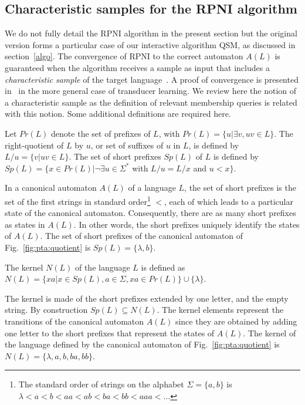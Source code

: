 \subsection{Characteristic samples for the RPNI algorithm\label{subsection:gi-background-rpni}}

We do not fully detail the RPNI algorithm in the present section but the original version forms a particular case
of our interactive algorithm \textsc{QSM}, as discussed in section~\ref{algo}. The convergence of RPNI to the correct automaton $A(L)$ is guaranteed when the algorithm receives a sample as input that includes a \textsl{characteristic sample} of the target language~\cite{Oncina:1992}. A proof of convergence is presented in~\cite{Oncina:1993} in the more general case of transducer learning. We review here the notion of a characteristic sample as the definition of relevant membership queries is related with this notion. Some additional definitions are required here.

\begin{definition} 
Let $Pr(L)$ denote the set of prefixes of $L$, with $Pr(L) = \{u | \exists v, uv \in L\}$. The right-quotient of $L$ by $u$, or set of suffixes of $u$ in $L$, is defined by $L/u = \{v | uv \in L\}$. The set of short prefixes $Sp(L)$ of $L$ is defined by $Sp(L) = \{x \in Pr(L) | \neg\exists u \in \Sigma^*$ with $L/u = L/x$ and $u < x\}$.
\end{definition}

In a canonical automaton $A(L)$ of a language $L$, the set of short prefixes is the set of the first strings in standard order\footnote{The standard order of strings on the alphabet $\Sigma=\{a,b\}$ is $\lambda < a < b < aa < ab < ba < bb < aaa < \ldots$} $<$, each of which leads to a particular state of the canonical automaton. Consequently, there are as many short prefixes as states in $A(L)$. In other words, the short prefixes uniquely identify the states of $A(L)$. The set of short prefixes of the canonical automaton of Fig.~\ref{fig:pta:quotient} is $Sp(L) = \{\lambda, b\}$.

\begin{definition}
 The kernel $N(L)$ of the language $L$ is defined as $N(L) = \{xa | x \in Sp(L), a \in \Sigma, xa \in Pr(L)\} \cup \{\lambda\}$.
\end{definition}

The kernel is made of the short prefixes extended by one letter, and the empty string. By construction $Sp(L) \subseteq N(L)$. The kernel elements represent the transitions of the canonical automaton $A(L)$ since they are obtained by adding one letter to the short prefixes that represent the states of $A(L)$. The kernel of the language defined by the canonical automaton of Fig.~\ref{fig:pta:quotient} is $N(L) = \{\lambda, a, b, ba, bb\}$.

